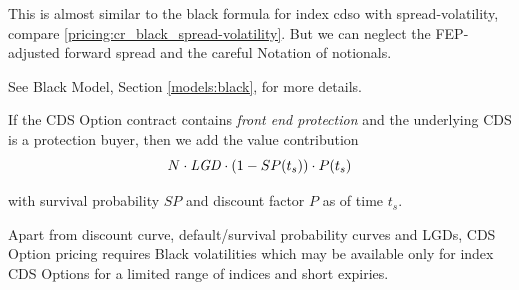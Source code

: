 This is almost similar to the black formula for index cdso with spread-volatility, compare \ref{pricing:cr_black_spread-volatility}.
But we can neglect the FEP-adjusted forward spread and the careful Notation of notionals.

See Black Model, Section \ref{models:black}, for more details.

\medskip
If the CDS Option contract contains {\em front end protection} and the
underlying CDS is a protection buyer, then we add the value contribution
\begin{equation}
N\cdot \mathit{LGD}\cdot (1-SP(t_s))\cdot P(t_s)
\end{equation}

with survival probability $SP$ and discount factor $P$ as of time $t_s$.

\medskip
Apart from discount curve, default/survival probability curves and
LGDs, CDS Option pricing requires Black volatilities which may be
available only for index CDS Options for a limited range of indices
and short expiries.

